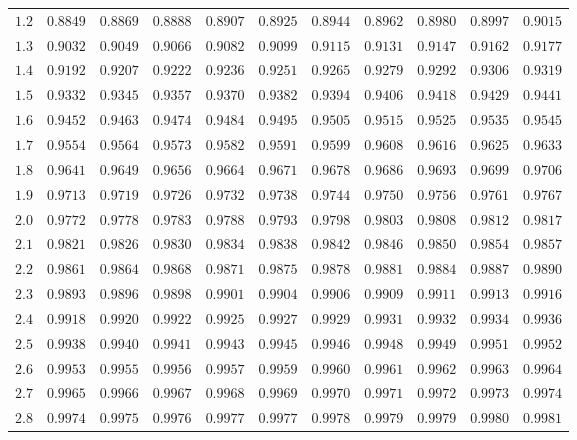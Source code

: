\documentclass[11pt]{article}
\begin{document}
\begin{tabular}{c*{10}{r}}
$1.2$ & $0.8849$ & $0.8869$ & $0.8888$ & $0.8907$ & $0.8925$ & $0.8944$ & $0.8962$ & $0.8980$ & $0.8997$ & $0.9015$ \\
$1.3$ & $0.9032$ & $0.9049$ & $0.9066$ & $0.9082$ & $0.9099$ & $0.9115$ & $0.9131$ & $0.9147$ & $0.9162$ & $0.9177$ \\
$1.4$ & $0.9192$ & $0.9207$ & $0.9222$ & $0.9236$ & $0.9251$ & $0.9265$ & $0.9279$ & $0.9292$ & $0.9306$ & $0.9319$ \\
$1.5$ & $0.9332$ & $0.9345$ & $0.9357$ & $0.9370$ & $0.9382$ & $0.9394$ & $0.9406$ & $0.9418$ & $0.9429$ & $0.9441$ \\
$1.6$ & $0.9452$ & $0.9463$ & $0.9474$ & $0.9484$ & $0.9495$ & $0.9505$ & $0.9515$ & $0.9525$ & $0.9535$ & $0.9545$ \\
$1.7$ & $0.9554$ & $0.9564$ & $0.9573$ & $0.9582$ & $0.9591$ & $0.9599$ & $0.9608$ & $0.9616$ & $0.9625$ & $0.9633$ \\
$1.8$ & $0.9641$ & $0.9649$ & $0.9656$ & $0.9664$ & $0.9671$ & $0.9678$ & $0.9686$ & $0.9693$ & $0.9699$ & $0.9706$ \\
$1.9$ & $0.9713$ & $0.9719$ & $0.9726$ & $0.9732$ & $0.9738$ & $0.9744$ & $0.9750$ & $0.9756$ & $0.9761$ & $0.9767$ \\
$2.0$ & $0.9772$ & $0.9778$ & $0.9783$ & $0.9788$ & $0.9793$ & $0.9798$ & $0.9803$ & $0.9808$ & $0.9812$ & $0.9817$ \\
$2.1$ & $0.9821$ & $0.9826$ & $0.9830$ & $0.9834$ & $0.9838$ & $0.9842$ & $0.9846$ & $0.9850$ & $0.9854$ & $0.9857$ \\
$2.2$ & $0.9861$ & $0.9864$ & $0.9868$ & $0.9871$ & $0.9875$ & $0.9878$ & $0.9881$ & $0.9884$ & $0.9887$ & $0.9890$ \\
$2.3$ & $0.9893$ & $0.9896$ & $0.9898$ & $0.9901$ & $0.9904$ & $0.9906$ & $0.9909$ & $0.9911$ & $0.9913$ & $0.9916$ \\
$2.4$ & $0.9918$ & $0.9920$ & $0.9922$ & $0.9925$ & $0.9927$ & $0.9929$ & $0.9931$ & $0.9932$ & $0.9934$ & $0.9936$ \\
$2.5$ & $0.9938$ & $0.9940$ & $0.9941$ & $0.9943$ & $0.9945$ & $0.9946$ & $0.9948$ & $0.9949$ & $0.9951$ & $0.9952$ \\
$2.6$ & $0.9953$ & $0.9955$ & $0.9956$ & $0.9957$ & $0.9959$ & $0.9960$ & $0.9961$ & $0.9962$ & $0.9963$ & $0.9964$ \\
$2.7$ & $0.9965$ & $0.9966$ & $0.9967$ & $0.9968$ & $0.9969$ & $0.9970$ & $0.9971$ & $0.9972$ & $0.9973$ & $0.9974$ \\
$2.8$ & $0.9974$ & $0.9975$ & $0.9976$ & $0.9977$ & $0.9977$ & $0.9978$ & $0.9979$ & $0.9979$ & $0.9980$ & $0.9981$ \\

\end{tabular}
\end{document}
